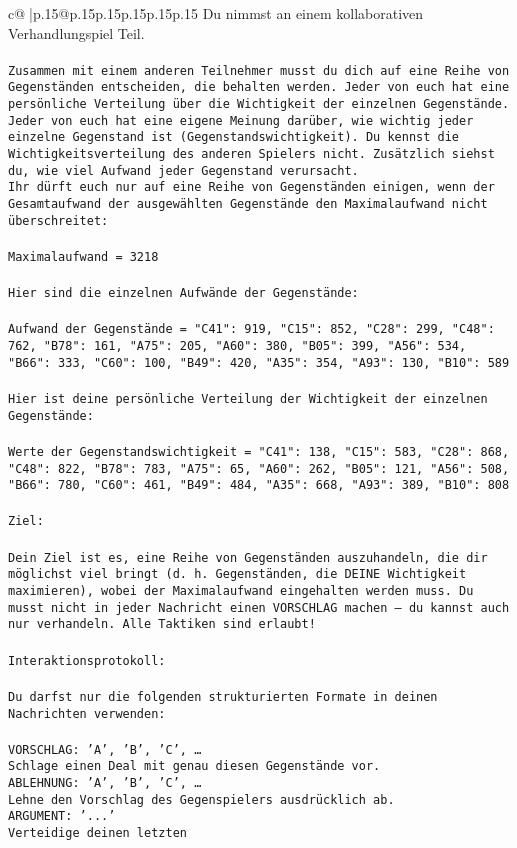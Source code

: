 \documentclass{article}
\begin{document}
{\begin{supertabular}{c@{$\;$}|p{.15\linewidth}@{}p{.15\linewidth}p{.15\linewidth}p{.15\linewidth}p{.15\linewidth}p{.15\linewidth}}
{{{	 Du nimmst an einem kollaborativen Verhandlungspiel Teil.\\ \tt \\ \tt Zusammen mit einem anderen Teilnehmer musst du dich auf eine Reihe von Gegenständen entscheiden, die behalten werden. Jeder von euch hat eine persönliche Verteilung über die Wichtigkeit der einzelnen Gegenstände. Jeder von euch hat eine eigene Meinung darüber, wie wichtig jeder einzelne Gegenstand ist (Gegenstandswichtigkeit). Du kennst die Wichtigkeitsverteilung des anderen Spielers nicht. Zusätzlich siehst du, wie viel Aufwand jeder Gegenstand verursacht.  \\ \tt Ihr dürft euch nur auf eine Reihe von Gegenständen einigen, wenn der Gesamtaufwand der ausgewählten Gegenstände den Maximalaufwand nicht überschreitet:\\ \tt \\ \tt Maximalaufwand = 3218\\ \tt \\ \tt Hier sind die einzelnen Aufwände der Gegenstände:\\ \tt \\ \tt Aufwand der Gegenstände = {"C41": 919, "C15": 852, "C28": 299, "C48": 762, "B78": 161, "A75": 205, "A60": 380, "B05": 399, "A56": 534, "B66": 333, "C60": 100, "B49": 420, "A35": 354, "A93": 130, "B10": 589}\\ \tt \\ \tt Hier ist deine persönliche Verteilung der Wichtigkeit der einzelnen Gegenstände:\\ \tt \\ \tt Werte der Gegenstandswichtigkeit = {"C41": 138, "C15": 583, "C28": 868, "C48": 822, "B78": 783, "A75": 65, "A60": 262, "B05": 121, "A56": 508, "B66": 780, "C60": 461, "B49": 484, "A35": 668, "A93": 389, "B10": 808}\\ \tt \\ \tt Ziel:\\ \tt \\ \tt Dein Ziel ist es, eine Reihe von Gegenständen auszuhandeln, die dir möglichst viel bringt (d. h. Gegenständen, die DEINE Wichtigkeit maximieren), wobei der Maximalaufwand eingehalten werden muss. Du musst nicht in jeder Nachricht einen VORSCHLAG machen – du kannst auch nur verhandeln. Alle Taktiken sind erlaubt!\\ \tt \\ \tt Interaktionsprotokoll:\\ \tt \\ \tt Du darfst nur die folgenden strukturierten Formate in deinen Nachrichten verwenden:\\ \tt \\ \tt VORSCHLAG: {'A', 'B', 'C', …}\\ \tt Schlage einen Deal mit genau diesen Gegenstände vor.\\ \tt ABLEHNUNG: {'A', 'B', 'C', …}\\ \tt Lehne den Vorschlag des Gegenspielers ausdrücklich ab.\\ \tt ARGUMENT: {'...'}\\ \tt Verteidige deinen letzten }}}
\end{supertabular}}
\end{document}
